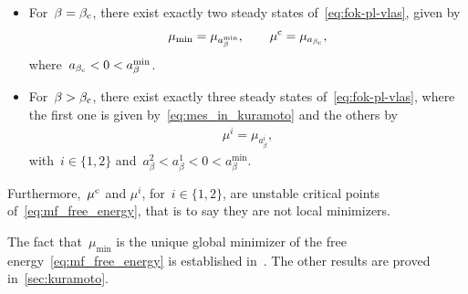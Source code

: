 \documentclass[onefignum,onetabnum]{siamart251216} %
\newcommand{\mescin}{\mu}
\theoremstyle{plain}
\numberwithin{equation}{section}
\numberwithin{theorem}{section}
\newcounter{ucounter}
\newcommand{\uv}[1]{
  \stepcounter{ucounter}
  \textcolor{orange}{
      \\[.2cm]
    U, comment \arabic{ucounter}. #1
    \\[.2cm]
  }
}
\renewcommand{\uv}[1]{\textcolor{orange}{#1}}
\begin{document}
\begin{lemma}
\begin{itemize}
        
        \item For~$\beta = \beta_{\rm c}$, there exist exactly two steady states of~\eqref{eq:fok-pl-vlas}, given by
        \begin{align*}
            \mescin_{\min} = \mu_{a_\beta^{\min}},\qquad
            \mescin^{\rm c} = \mu_{a_{\beta_{\rm c}}},
        \end{align*}
        where~$a_{\beta_{\rm c}} < 0 < a_\beta^{\min}$.
        \item For~$\beta > \beta_{\rm c}$, there exist exactly three steady states of~\eqref{eq:fok-pl-vlas}, where the first one is given by~\eqref{eq:mes_in_kuramoto}
            and the others by
        \begin{align*}
            \mescin^i = \mu_{a_\beta^i},
        \end{align*}
        with~$i \in \{1,2\}$ and~$a_\beta^2 < a_\beta^1 < 0 < a_\beta^{\min}$.
    \end{itemize}
    Furthermore,~$\mescin^{\rm c}$ and $\mescin^i$, for~$i \in \{1,2\}$, are unstable critical points of~\eqref{eq:mf_free_energy}, that is to say they are not local minimizers.
\end{lemma}
The fact that~$\mescin_{\min}$ is the unique global minimizer of the free energy~\eqref{eq:mf_free_energy} is established in~\cite[Lemma 1.26]{delgadino2021diffusive}. The other results are proved in~\cref{sec:kuramoto}.
\end{document}
